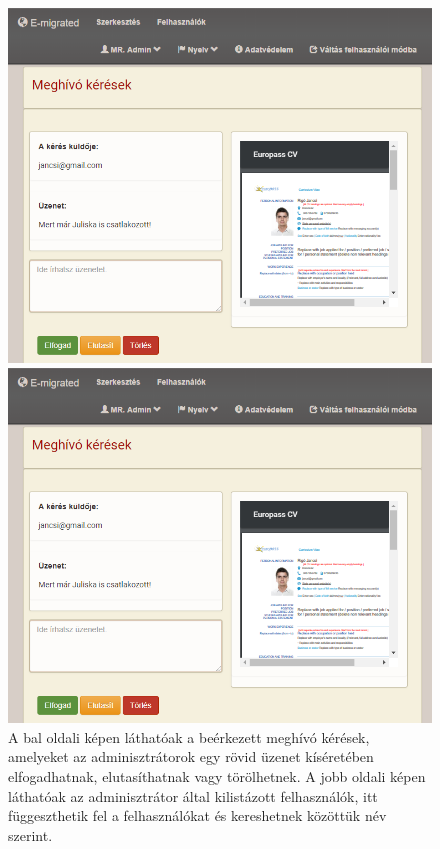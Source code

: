 \begin{figure}[t]
    \centering
    \begin{minipage}{0.49\linewidth}
        \centering
        \includegraphics[width=0.9\linewidth]{images/meghivo_keres_admin}
    \end{minipage}
    \begin{minipage}{0.49\linewidth}
        \centering
        \includegraphics[width=0.9\linewidth]{images/meghivo_keres_admin}
    \end{minipage}
    \caption{A bal oldali képen láthatóak a beérkezett meghívó kérések, amelyeket az adminisztrátorok egy rövid üzenet kíséretében elfogadhatnak, elutasíthatnak vagy törölhetnek. A jobb oldali képen láthatóak az adminisztrátor által kilistázott felhasználók, itt függeszthetik fel a felhasználókat és kereshetnek közöttük név szerint. }
    \label{fig:admin}
\end{figure}











